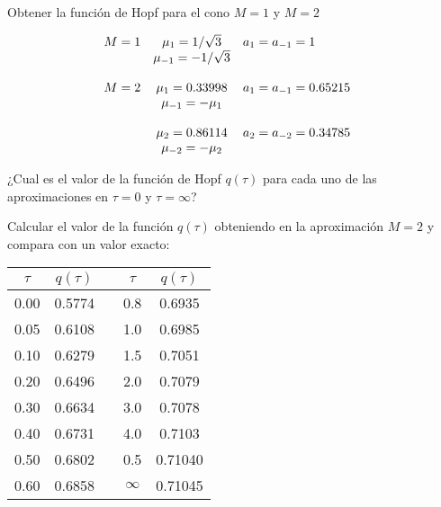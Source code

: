 \documentclass[12pt,spanish,a4paper]{practice}
\begin{document}
    \begin{problem}\label{prob:7}
        \begin{ppart}\label{prob:7:a}
            Obtener la función de Hopf para el cono $M=1$ y $M=2$

            \begin{equation*}
                \begin{array}{l c l c l}
                    M=1 & \mu_{1}=1/\sqrt{3}  & a_{1} = a_{-1} = 1\\
                      & \mu_{-1}= -1/\sqrt{3}  &  \\
                       &         &             &   \\
                    M=2 & \mu_{1}=0.33998  & a_{1} = a_{-1} =0.65215\\
                      & \mu_{-1}= -\mu_{1}  &  \\
                    &         &             &   \\
                      & \mu_{2}=0.86114  & a_{2} = a_{-2} =0.34785\\
                      & \mu_{-2}= -\mu_{2}  &
                \end{array}
            \end{equation*}
        \end{ppart}


        \begin{ppart}\label{prob:7:b}
            ¿Cual es el valor de la función de Hopf $q(\tau)$ para cada uno de las aproximaciones en $ \tau = 0 $ y $\tau = \infty$?
        \end{ppart}

        \begin{ppart}\label{prob:7:c}
            Calcular el valor de la función $q(\tau)$ obteniendo en la aproximación $M=2$ y compara con un valor exacto:

                \begin{table}[h!]
                \centering
                    \begin{tabular}{c |c l c|c}

                         $\tau$ & $q(\tau)$ &  &$\tau$ & $q(\tau)$ \\ [0.5ex]
                         \hline
                         0.00 & 0.5774 &  &0.8 & 0.6935 \\
                         0.05 & 0.6108 &  & 1.0 & 0.6985\\
                         0.10 & 0.6279 &  & 1.5 & 0.7051\\
                         0.20 & 0.6496 &  & 2.0 & 0.7079\\
                         0.30 & 0.6634 &  & 3.0 & 0.7078\\
                         0.40 & 0.6731 &  & 4.0 & 0.7103\\
                         0.50 & 0.6802 &  & 0.5 & 0.71040\\
                         0.60 & 0.6858 &  & $\infty$ & 0.71045\\ [1ex]


\end{tabular}
\end{table}
\end{ppart}
\end{problem}
\end{document}
